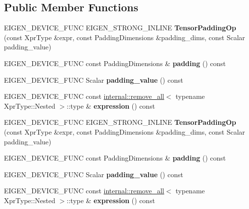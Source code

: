 \subsection*{Public Member Functions}
\begin{DoxyCompactItemize}
\item 
\mbox{\label{class_eigen_1_1_tensor_padding_op_a6076ec28131aa5740daaae7ceda46ad7}} 
E\+I\+G\+E\+N\+\_\+\+D\+E\+V\+I\+C\+E\+\_\+\+F\+U\+NC E\+I\+G\+E\+N\+\_\+\+S\+T\+R\+O\+N\+G\+\_\+\+I\+N\+L\+I\+NE {\bfseries Tensor\+Padding\+Op} (const Xpr\+Type \&expr, const Padding\+Dimensions \&padding\+\_\+dims, const Scalar padding\+\_\+value)
\item 
\mbox{\label{class_eigen_1_1_tensor_padding_op_a8f88d8c367e4b4c79b060bb29f7ed5a4}} 
E\+I\+G\+E\+N\+\_\+\+D\+E\+V\+I\+C\+E\+\_\+\+F\+U\+NC const Padding\+Dimensions \& {\bfseries padding} () const
\item 
\mbox{\label{class_eigen_1_1_tensor_padding_op_ae122e70a35284599706c00cf85bb7d0e}} 
E\+I\+G\+E\+N\+\_\+\+D\+E\+V\+I\+C\+E\+\_\+\+F\+U\+NC Scalar {\bfseries padding\+\_\+value} () const
\item 
\mbox{\label{class_eigen_1_1_tensor_padding_op_a5001c2fe44b985b509fb470caf2b99cd}} 
E\+I\+G\+E\+N\+\_\+\+D\+E\+V\+I\+C\+E\+\_\+\+F\+U\+NC const \hyperlink{struct_eigen_1_1internal_1_1remove__all}{internal\+::remove\+\_\+all}$<$ typename Xpr\+Type\+::\+Nested $>$\+::type \& {\bfseries expression} () const
\item 
\mbox{\label{class_eigen_1_1_tensor_padding_op_a6076ec28131aa5740daaae7ceda46ad7}} 
E\+I\+G\+E\+N\+\_\+\+D\+E\+V\+I\+C\+E\+\_\+\+F\+U\+NC E\+I\+G\+E\+N\+\_\+\+S\+T\+R\+O\+N\+G\+\_\+\+I\+N\+L\+I\+NE {\bfseries Tensor\+Padding\+Op} (const Xpr\+Type \&expr, const Padding\+Dimensions \&padding\+\_\+dims, const Scalar padding\+\_\+value)
\item 
\mbox{\label{class_eigen_1_1_tensor_padding_op_a8f88d8c367e4b4c79b060bb29f7ed5a4}} 
E\+I\+G\+E\+N\+\_\+\+D\+E\+V\+I\+C\+E\+\_\+\+F\+U\+NC const Padding\+Dimensions \& {\bfseries padding} () const
\item 
\mbox{\label{class_eigen_1_1_tensor_padding_op_ae122e70a35284599706c00cf85bb7d0e}} 
E\+I\+G\+E\+N\+\_\+\+D\+E\+V\+I\+C\+E\+\_\+\+F\+U\+NC Scalar {\bfseries padding\+\_\+value} () const
\item 
\mbox{\label{class_eigen_1_1_tensor_padding_op_a5001c2fe44b985b509fb470caf2b99cd}} 
E\+I\+G\+E\+N\+\_\+\+D\+E\+V\+I\+C\+E\+\_\+\+F\+U\+NC const \hyperlink{struct_eigen_1_1internal_1_1remove__all}{internal\+::remove\+\_\+all}$<$ typename Xpr\+Type\+::\+Nested $>$\+::type \& {\bfseries expression} () const
\end{DoxyCompactItemize}
